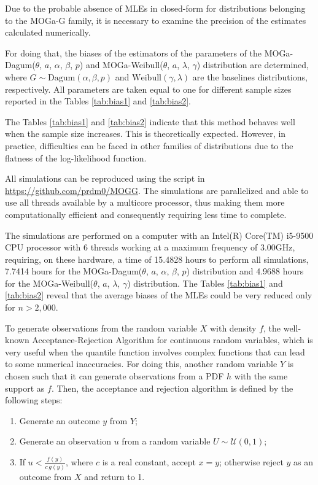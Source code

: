 \documentclass[twoside,leqno,11pt]{article}
\begin{document}
{\color{red}Due to the probable absence of MLEs in closed-form for distributions belonging to the MOGa-G family, it is necessary to examine the precision of the estimates calculated numerically. 

For doing that, the biases of the estimators of the parameters of the
MOGa-Dagum($\theta$, $a$, $\alpha$, $\beta$, $p$) and  MOGa-Weibull($\theta$, $a$, $\lambda$, $\gamma$) distribution are determined, where $G\sim \mathrm {Dagum} (\alpha, \beta, p)$ and  $\mathrm {Weibull} (\gamma, \lambda)$ are the baselines distributions, respectively. All parameters are taken equal to one for different sample sizes reported in the Tables \ref{tab:bias1} and \ref{tab:bias2}. 

The Tables \ref{tab:bias1} and \ref{tab:bias2} indicate that this method behaves well when the sample size increases. This is theoretically expected. However, in practice, difficulties can be faced in other families of distributions due to the flatness of the log-likelihood function.

All simulations can be reproduced using the script in \url{https://github.com/prdm0/MOGG}. The simulations are parallelized and able to use all threads available by a multicore processor, thus making them more computationally efficient and consequently requiring less time to complete. 

The simulations are performed on a computer with an Intel(R) Core(TM) i5-9500 CPU processor with 6 threads working at a maximum frequency of 3.00GHz, requiring, on these hardware, a time of 15.4828 hours to perform all simulations, 7.7414 hours for the MOGa-Dagum($\theta$, $a$, $\alpha$, $\beta$, $p$) distribution and 4.9688 hours for the MOGa-Weibull($\theta$, $a$, $\lambda$, $\gamma$) distribution. The  Tables \ref{tab:bias1} and  \ref{tab:bias2} reveal that the average biases of the MLEs could be very reduced only for $n> 2,000$.}

To generate observations from the random variable $X$ with density $f$, the well-known Acceptance-Rejection Algorithm for continuous random variables, which is very useful when the quantile function involves complex functions that can lead to some numerical inaccuracies. For doing this, another random variable $Y$ is chosen such that it can generate observations from a PDF $h$ with the same support as $f$. Then, the acceptance and rejection algorithm is defined by the following steps:
\begin{enumerate}
	\item Generate an outcome $y$ from $Y$;
	\item Generate an observation $u$ from a random variable $U\sim \mathcal{U}(0,1)$;
	\item If $u < \frac{f(y)}{c\, g(y)}$, where $c$ is a real constant, accept $x=y$; otherwise reject $y$ as an outcome from $X$ and return to 1.
\end{enumerate}
\end{document}
